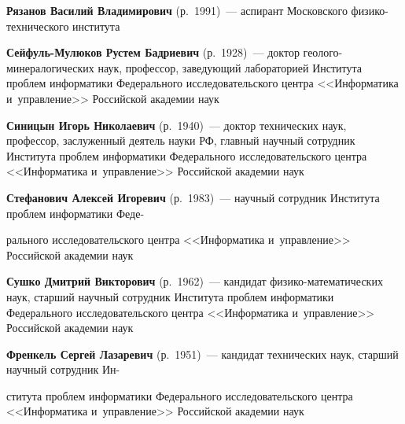 \begin{multicols}{2}
 \vspace*{3pt}
 
\noindent
\textbf{Рязанов Василий Владимирович} (р.\ 1991)~--- 
аспирант Московского фи\-зи\-ко-тех\-ни\-че\-ско\-го института

\vspace*{3pt}

\noindent
\textbf{Сейфуль-Мулюков Рустем Бадриевич} (р.\ 1928)~--- 
доктор гео\-ло\-го-ми\-не\-ра\-ло\-ги\-че\-ских наук, профессор, заведующий 
лабораторией Института \mbox{проб\-лем} информатики Федерального исследовательского 
центра <<Информатика и~управ\-ле\-ние>> Российской академии наук

\vspace*{3pt}

 \noindent
\textbf{Синицын Игорь Николаевич} (р.\ 1940)~--- 
доктор технических наук, профессор, заслуженный деятель науки РФ, главный 
научный сотрудник Института проб\-лем информатики Федерального исследовательского центра 
<<Информатика и~управ\-ле\-ние>> Российской академии наук

\vspace*{3pt}

 \noindent
\textbf{Стефанович Алексей Игоревич} (р.\ 1983)~--- 
научный сотрудник Института проб\-лем информатики Феде-\linebreak\vspace*{-12pt}

\pagebreak

\noindent
рального исследовательского 
центра <<Информатика и~управ\-ле\-ние>> Российской академии наук

\vspace*{3pt}

 \noindent
\textbf{Сушко Дмитрий Викторович} (р.\ 1962)~--- 
кандидат фи\-зи\-ко-ма\-те\-ма\-ти\-че\-ских наук, старший научный сотрудник 
Института проб\-лем информатики Федерального исследовательского центра 
<<Информатика и~управ\-ле\-ние>> Российской академии наук

\vspace*{3pt}

\noindent
\textbf{Френкель Сергей Лазаревич} (р.\ 1951)~---
 кандидат технических наук, старший научный сотрудник Ин-\linebreak\vspace*{-12pt}
 
 \columnbreak
 
 \noindent
 ститута проб\-лем 
 информатики Федерального исследовательского центра <<Информатика и~управ\-ле\-ние>>
 Российской академии наук


\end{multicols}
